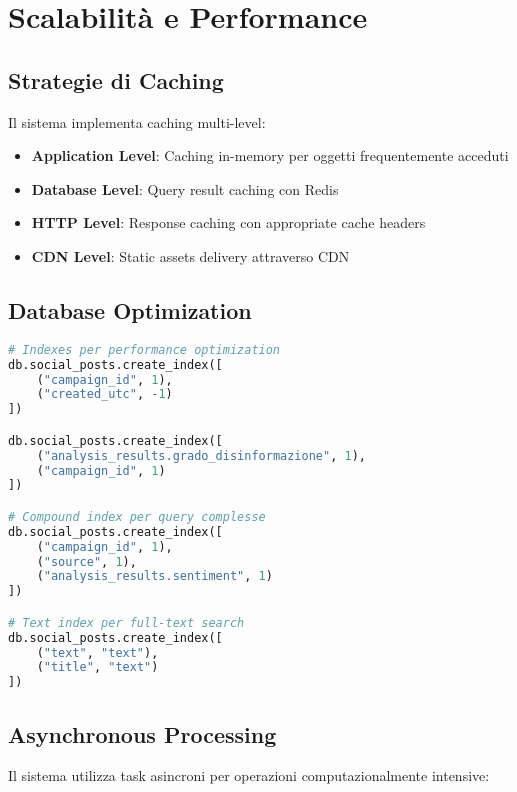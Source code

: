 \documentclass[12pt,a4paper]{report}
\begin{document}
\section{Scalabilità e Performance}

\subsection{Strategie di Caching}

Il sistema implementa caching multi-level:

\begin{itemize}
    \item \textbf{Application Level}: Caching in-memory per oggetti frequentemente acceduti
    \item \textbf{Database Level}: Query result caching con Redis
    \item \textbf{HTTP Level}: Response caching con appropriate cache headers
    \item \textbf{CDN Level}: Static assets delivery attraverso CDN
\end{itemize}

\subsection{Database Optimization}

\begin{lstlisting}[language=Python, caption=MongoDB Indexing Strategy]
# Indexes per performance optimization
db.social_posts.create_index([
    ("campaign_id", 1),
    ("created_utc", -1)
])

db.social_posts.create_index([
    ("analysis_results.grado_disinformazione", 1),
    ("campaign_id", 1)
])

# Compound index per query complesse
db.social_posts.create_index([
    ("campaign_id", 1),
    ("source", 1),
    ("analysis_results.sentiment", 1)
])

# Text index per full-text search
db.social_posts.create_index([
    ("text", "text"),
    ("title", "text")
])
\end{lstlisting}

\subsection{Asynchronous Processing}

Il sistema utilizza task asincroni per operazioni computazionalmente intensive:
\end{document}
